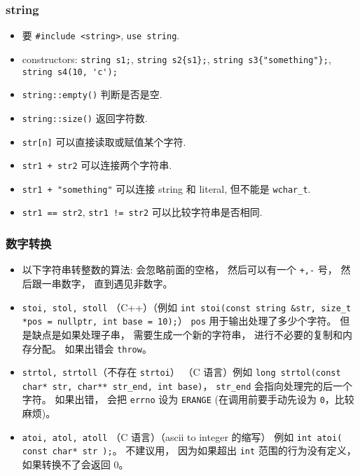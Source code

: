 \subsubsection{string}
\begin{itemize}
\item 要 \verb`#include <string>`, \verb`use string`.
\item constructors: \verb`string s1;`, \verb`string s2{s1};`, \verb`string s3{"something"};`, \verb`string s4(10, 'c');`
\item \verb`string::empty()` 判断是否是空.
\item \verb`string::size()` 返回字符数.
\item \verb`str[n]` 可以直接读取或赋值某个字符.
\item \verb`str1 + str2` 可以连接两个字符串.
\item \verb`str1 + "something"` 可以连接 string 和 literal, 但不能是 \verb`wchar_t`.
\item \verb`str1 == str2`, \verb`str1 != str2` 可以比较字符串是否相同.
\end{itemize}

\subsubsection{数字转换}
\begin{itemize}
\item 以下字符串转整数的算法: 会忽略前面的空格， 然后可以有一个 \verb|+,-| 号， 然后跟一串数字， 直到遇见非数字。
\item \verb|stoi, stol, stoll| （C++）（例如 \verb|int stoi(const string &str, size_t *pos = nullptr, int base = 10);|） \verb|pos| 用于输出处理了多少个字符。 但是缺点是如果处理子串， 需要生成一个新的字符串， 进行不必要的复制和内存分配。 如果出错会 \verb|throw|。
\item \verb|strtol, strtoll|（不存在 \verb|strtoi|） （C 语言）例如 \verb|long strtol(const char* str, char** str_end, int base)|， \verb|str_end| 会指向处理完的后一个字符。 如果出错， 会把 \verb|errno| 设为 \verb|ERANGE| (在调用前要手动先设为 \verb|0|，比较麻烦)。
\item \verb|atoi, atol, atoll| （C 语言）（ascii to integer 的缩写） 例如 \verb|int atoi( const char* str );|。 不建议用， 因为如果超出 \verb|int| 范围的行为没有定义， 如果转换不了会返回 0。
\end{itemize}


